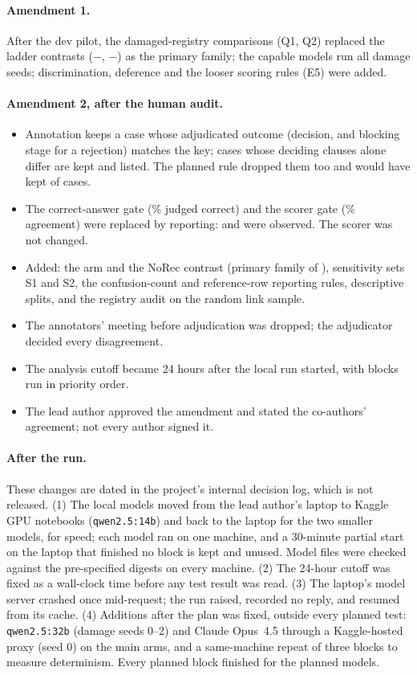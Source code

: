 \paragraph{Amendment 1.} After the dev pilot, the damaged-registry comparisons (Q1, Q2) replaced the ladder
contrasts ($-$, $-$) as the primary family; the capable models run all
\NDamageSeedsCapable{} damage seeds; discrimination, deference and the looser scoring rules (E5) were added.
\paragraph{Amendment 2, after the human audit.}
\begin{itemize}
  \item Annotation keeps a case whose adjudicated outcome (decision, and blocking stage for a rejection) matches the key;
  cases whose deciding clauses alone differ are kept and listed. The planned rule dropped them too and would have
  kept \NStrictKept{} of \NCandidateCases{} cases.
  \item The correct-answer gate (\ControlsGatePct\% judged correct) and the scorer gate (\ScorerCheckPct\% agreement)
  were replaced by reporting: \PctControlsCorrect{} and \ScorerCheckPctObserved{} were observed. The scorer was not
  changed.
  \item Added: the  arm and the NoRec contrast (primary family of \NPrimaryTestsVFive{}), sensitivity sets S1 and
  S2, the confusion-count and reference-row reporting rules, descriptive splits, and the registry audit on the random
  link sample.
  \item The annotators' meeting before adjudication was dropped; the adjudicator decided every disagreement.
  \item The analysis cutoff became 24 hours after the local run started, with blocks run in priority order.
  \item The lead author approved the amendment and stated the co-authors' agreement; not every author signed it.
\end{itemize}
\paragraph{After the run.}
These changes are dated in the project's internal decision log, which is not released. (1) The local models moved from the lead author's laptop to Kaggle GPU notebooks
(\texttt{qwen2.5:14b}) and back to the laptop for the two smaller models, for speed; each model ran on one machine,
and a 30-minute partial start on the laptop that finished no block is kept and unused. Model files were checked
against the pre-specified digests on every machine. (2) The 24-hour cutoff was fixed as a wall-clock time before any
test result was read. (3) The laptop's model server crashed once mid-request; the run raised, recorded no reply, and
resumed from its cache. (4) Additions after the plan was fixed, outside every planned test: \texttt{qwen2.5:32b} (damage seeds 0--2) and Claude
Opus~4.5 through a Kaggle-hosted proxy (seed 0) on the main arms, and a same-machine repeat of three blocks to measure
determinism. Every planned block finished for the planned models.

